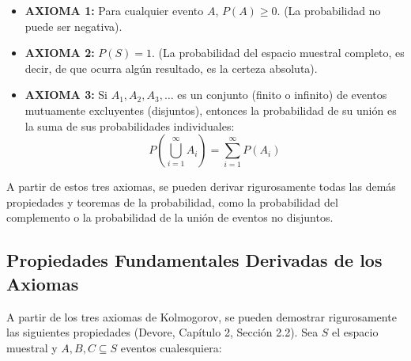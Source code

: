 \begin{itemize}
    \item \textbf{AXIOMA 1:} Para cualquier evento $A$, $P(A) \ge 0$. (La probabilidad no puede ser negativa).
    \item \textbf{AXIOMA 2:} $P(S) = 1$. (La probabilidad del espacio muestral completo, es decir, de que ocurra algún resultado, es la certeza absoluta).
    \item \textbf{AXIOMA 3:} Si $A_1, A_2, A_3, \dots$ es un conjunto (finito o infinito) de eventos mutuamente excluyentes (disjuntos), entonces la probabilidad de su unión es la suma de sus probabilidades individuales:
    $$ P\left(\bigcup_{i=1}^{\infty} A_i\right) = \sum_{i=1}^{\infty} P(A_i) $$
\end{itemize}

A partir de estos tres axiomas, se pueden derivar rigurosamente todas las demás propiedades y teoremas de la probabilidad, como la probabilidad del complemento o la probabilidad de la unión de eventos no disjuntos.

\subsection{Propiedades Fundamentales Derivadas de los Axiomas}

A partir de los tres axiomas de Kolmogorov, se pueden demostrar rigurosamente las siguientes propiedades (Devore, Capítulo 2, Sección 2.2). Sea $S$ el espacio muestral y $A, B, C \subseteq S$ eventos cualesquiera:


